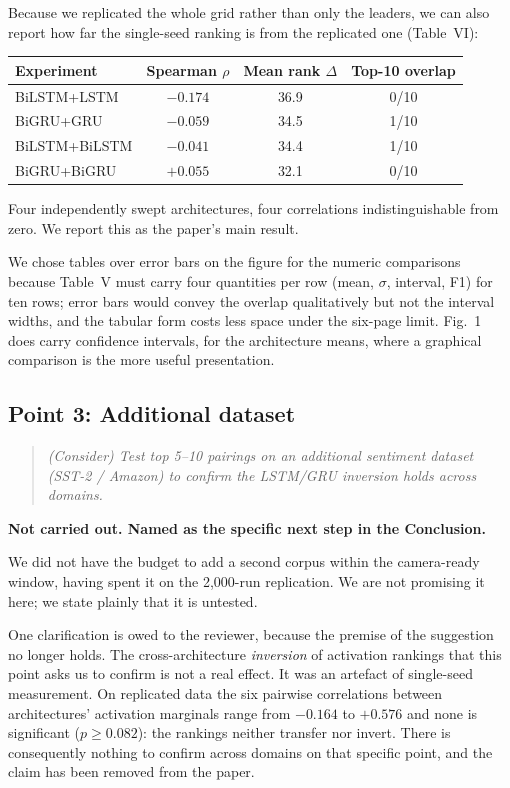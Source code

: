 \documentclass[10pt,a4paper]{article}
\newenvironment{rev}%
  {\begin{quote}\itshape\color{quotegray}}%
  {\end{quote}}
\newcommand{\pt}[1]{\textbf{#1}}
\begin{document}
Because we replicated the whole grid rather than only the leaders,
we can also report how far the single-seed ranking is from the
replicated one (Table~VI):

\begin{center}
\begin{tabular}{lccc}
\toprule
Experiment & Spearman $\rho$ & Mean rank $\Delta$ & Top-10 overlap \\
\midrule
BiLSTM+LSTM   & $-0.174$ & 36.9 & 0/10 \\
BiGRU+GRU     & $-0.059$ & 34.5 & 1/10 \\
BiLSTM+BiLSTM & $-0.041$ & 34.4 & 1/10 \\
BiGRU+BiGRU   & $+0.055$ & 32.1 & 0/10 \\
\bottomrule
\end{tabular}
\end{center}

Four independently swept architectures, four correlations
indistinguishable from zero. We report this as the paper's main
result.

We chose tables over error bars on the figure for the numeric
comparisons because Table~V must carry four quantities per row
(mean, $\sigma$, interval, F1) for ten rows; error bars would
convey the overlap qualitatively but not the interval widths, and
the tabular form costs less space under the six-page limit. Fig.~1
does carry confidence intervals, for the architecture means, where
a graphical comparison is the more useful presentation.

\subsection*{Point 3: Additional dataset}

\begin{rev}
(Consider) Test top 5--10 pairings on an additional sentiment
dataset (SST-2 / Amazon) to confirm the LSTM/GRU inversion holds
across domains.
\end{rev}

\noindent\pt{Not carried out. Named as the specific next step in
the Conclusion.}

We did not have the budget to add a second corpus within the
camera-ready window, having spent it on the 2{,}000-run
replication. We are not promising it here; we state plainly that
it is untested.

One clarification is owed to the reviewer, because the premise of
the suggestion no longer holds. The cross-architecture
\emph{inversion} of activation rankings that this point asks us to
confirm is not a real effect. It was an artefact of single-seed
measurement. On replicated data the six pairwise correlations
between architectures' activation marginals range from $-0.164$ to
$+0.576$ and none is significant ($p\geq0.082$): the rankings
neither transfer nor invert. There is consequently nothing to
confirm across domains on that specific point, and the claim has
been removed from the paper.
\end{document}

